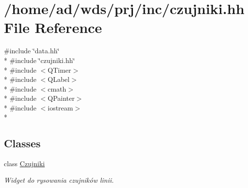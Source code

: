 \hypertarget{czujniki_8hh}{}\section{/home/ad/wds/prj/inc/czujniki.hh File Reference}
\label{czujniki_8hh}
{\ttfamily \#include \char`\"{}data.\+hh\char`\"{}}\\*
{\ttfamily \#include \char`\"{}czujniki.\+hh\char`\"{}}\\*
{\ttfamily \#include $<$Q\+Timer$>$}\\*
{\ttfamily \#include $<$Q\+Label$>$}\\*
{\ttfamily \#include $<$cmath$>$}\\*
{\ttfamily \#include $<$Q\+Painter$>$}\\*
{\ttfamily \#include $<$iostream$>$}\\*
\subsection*{Classes}
\begin{DoxyCompactItemize}
\item 
class \hyperlink{class_czujniki}{Czujniki}
\begin{DoxyCompactList}\small\item\em Widget do rysowania czujników linii. \end{DoxyCompactList}\end{DoxyCompactItemize}
